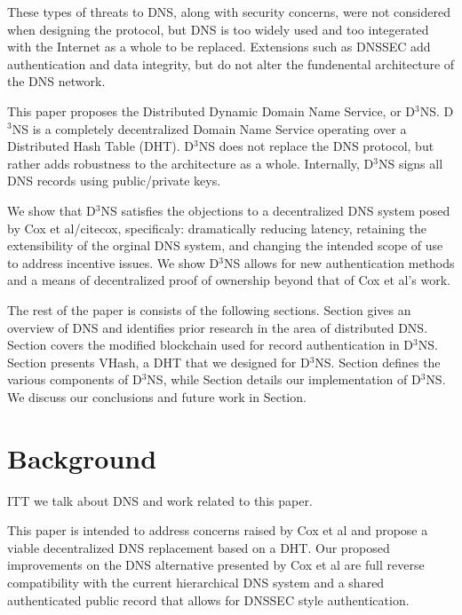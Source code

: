 \documentclass[11pt]{IEEEtran} %
\begin{document}
These types of threats to DNS, along with security concerns, were not considered when designing the protocol, but DNS is too widely used and too integerated with the Internet as a whole to be replaced. Extensions such as DNSSEC \cite{blacka2013clarifications} add authentication and data integrity, but do not alter the fundenental architecture of the DNS network.


This paper proposes the Distributed Dynamic Domain Name Service, or D$^{3}$NS.  D$^{3}$NS is a completely decentralized Domain Name Service operating over a Distributed Hash Table (DHT).  D$^{3}$NS does not replace the DNS protocol, but rather adds robustness to the architecture as a whole.  Internally, D$^3$NS signs all DNS records using public/private keys.


We show that D$^{3}$NS satisfies the objections to a decentralized DNS system posed by Cox et al/cite{cox}, specificaly: dramatically reducing latency, retaining the extensibility of the orginal DNS system, and changing the intended scope of use to address incentive issues. We show D$^{3}$NS allows for new authentication methods and a means of decentralized proof of ownership beyond that of Cox et al's work. 



The rest of the paper is consists of the following sections.  Section gives an overview of DNS and identifies prior research in the area of distributed DNS.  Section covers the modified blockchain used for record authentication in D$^3$NS.  Section presents VHash, a DHT that we designed for D$^3$NS.  Section defines the various components of D$^3$NS, while Section details our implementation of D$^3$NS.  We discuss our conclusions and future work in Section.



\section{Background}



ITT we talk about DNS and work related to this paper.


This paper is intended to address concerns raised by Cox et al\cite{cox} and propose a viable decentralized DNS replacement based on a DHT. Our proposed improvements on the DNS alternative presented by Cox et al are full reverse compatibility with the current hierarchical DNS system and a shared authenticated public record that allows for DNSSEC style authentication.
\end{document}
